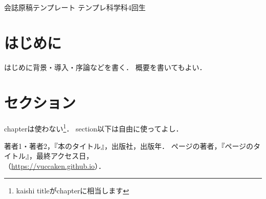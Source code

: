 \documentclass[uplatex,dvipdfmx]{vkaishi}
\begin{document}


\kaishititle%
  {会誌原稿テンプレート}%
  {テンプレ科学科4回生}%
  {}%


\section*{はじめに}
はじめに背景・導入・序論などを書く．
概要を書いてもよい．


\section{セクション}
chapterは使わない\footnote{kaishi titleがchapterに相当します}．
section以下は自由に使ってよし．


\begin{thebibliography}{99}
   著者1・著者2，『本のタイトル』，出版社，出版年．
   ページの著者，『ページのタイトル』，最終アクセス日，\\（\url{https://vuccaken.github.io}）．
\end{thebibliography}
\end{document}
